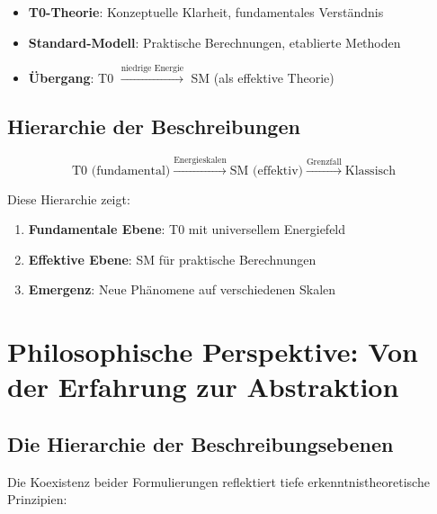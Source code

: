 	\begin{tcolorbox}[colback=yellow!5!white,colframe=yellow!75!black,title=Fundamentale Komplementarität]
		\begin{itemize}
			\item \textbf{T0-Theorie}: Konzeptuelle Klarheit, fundamentales Verständnis
			\item \textbf{Standard-Modell}: Praktische Berechnungen, etablierte Methoden
			\item \textbf{Übergang}: T0 $\xrightarrow{\text{niedrige Energie}}$ SM (als effektive Theorie)
		\end{itemize}
	\end{tcolorbox}
	
	\subsection{Hierarchie der Beschreibungen}
	
	\begin{equation}
		\text{T0 (fundamental)} \xrightarrow{\text{Energieskalen}} \text{SM (effektiv)} \xrightarrow{\text{Grenzfall}} \text{Klassisch}
	\end{equation}
	
	Diese Hierarchie zeigt:
	\begin{enumerate}
		\item \textbf{Fundamentale Ebene}: T0 mit universellem Energiefeld
		\item \textbf{Effektive Ebene}: SM für praktische Berechnungen
		\item \textbf{Emergenz}: Neue Phänomene auf verschiedenen Skalen
	\end{enumerate}
	
	\section{Philosophische Perspektive: Von der Erfahrung zur Abstraktion}
	
	\subsection{Die Hierarchie der Beschreibungsebenen}
	
	Die Koexistenz beider Formulierungen reflektiert tiefe erkenntnistheoretische Prinzipien:
	
